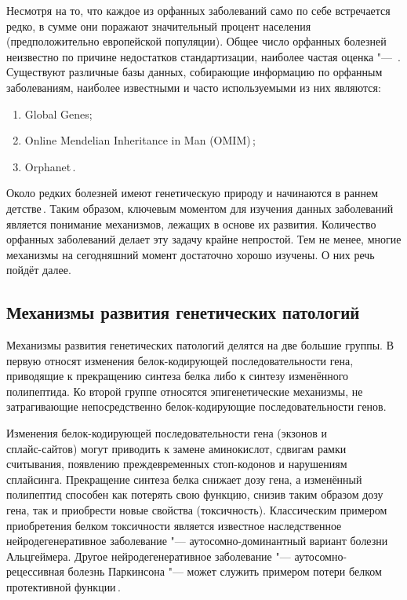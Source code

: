 \documentclass[a4paper,14pt]{extarticle}
\newcommand{\thousands}{тыс.}
\newcommand{\ecitep}[1]{\textenglish{\citep{#1}}}
\begin{document}
Несмотря на то, что каждое из орфанных заболеваний само по себе встречается редко, в сумме они поражают значительный процент населения (предположительно  европейской популяции).
Общее число орфанных болезней неизвестно по причине недостатков стандартизации, наиболее частая оценка "--- \numprint[\thousands]{5--8}\,\ecitep{The_Lancet_Neurology_2011}.
Существуют различные базы данных, собирающие информацию по орфанным заболеваниям, наиболее известными и часто используемыми из них являются:

\begin{enumerate}
	\item Global Genes;
	\item Online Mendelian Inheritance in Man (OMIM\textregistered)\,\ecitep{Amberger_2014};
	\item Orphanet\,\ecitep{Orphanet}.
\end{enumerate}

Около  редких болезней имеют генетическую природу и начинаются в раннем детстве\,\ecitep{The_Lancet_Neurology_2011}.
Таким образом, ключевым моментом для изучения данных заболеваний является понимание механизмов, лежащих в основе их развития.
Количество орфанных заболеваний делает эту задачу крайне непростой.
Тем не менее, многие механизмы на сегодняшний момент достаточно хорошо изучены.
О них речь пойдёт далее.

\subsection{Механизмы развития генетических патологий}

Механизмы развития генетических патологий делятся на две большие группы.
В первую относят изменения белок-кодирующей последовательности гена, приводящие к прекращению синтеза белка либо к синтезу изменённого полипептида.
Ко второй группе относятся эпигенетические механизмы, не затрагивающие непосредственно белок-кодирующие последовательности генов.

Изменения белок-кодирующей последовательности гена (экзонов и\\сплайс-сайтов) могут приводить к замене аминокислот, сдвигам рамки считывания, появлению преждевременных стоп-кодонов и нарушениям сплайсинга.
Прекращение синтеза белка снижает дозу гена, а изменённый полипептид способен как потерять свою функцию, снизив таким образом дозу гена, так и приобрести новые свойства (токсичность).
Классическим примером приобретения белком токсичности является известное наследственное нейродегенеративное заболевание "--- аутосомно\hyp{}доминантный вариант болезни Альцгеймера.
Другое нейродегенеративное заболевание "--- аутосомно\hyp{}рецессивная болезнь Паркинсона "--- может служить примером потери белком протективной функции\,\ecitep{Winklhofer_2008}.
\end{document}
